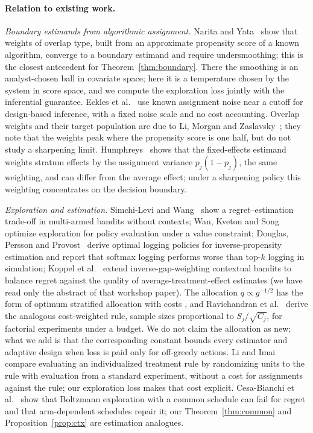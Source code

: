 \documentclass[12pt]{article}
\theoremstyle{definition}
\theoremstyle{remark}
\begin{document}
\paragraph{Relation to existing work.}
\emph{Boundary estimands from algorithmic assignment.}
Narita and Yata~\cite{narita2021algorithm} show that weights of overlap type, built from an
approximate propensity score of a known algorithm, converge to a boundary
estimand and require undersmoothing; this is the closest antecedent for
Theorem~\ref{thm:boundary}. There the smoothing is an analyst-chosen ball in
covariate space; here it is a temperature chosen by the system in score space,
and we compute the exploration loss jointly with the inferential guarantee.
Eckles et al.~\cite{eckles2020noise} use known assignment noise near a cutoff for
design-based inference, with a fixed noise scale and no cost accounting.
Overlap weights and their target population are due to
Li, Morgan and Zaslavsky~\cite{li2018balancing}; they note that the weights peak where the propensity
score is one half, but do not study a sharpening limit. Humphreys~\cite{humphreys2025bounds}
shows that the fixed-effects estimand weights stratum effects by the assignment
variance $p_j(1-p_j)$, the same weighting, and can differ from the average
effect; under a sharpening policy this weighting concentrates on the decision
boundary.

\emph{Exploration and estimation.} Simchi-Levi and Wang~\cite{simchilevi2023multi} show a
regret--estimation trade-off in multi-armed bandits without contexts;
Wan, Kveton and Song~\cite{wan2022safe} optimize exploration for policy evaluation under a value
constraint; Douglas, Persson and Provost~\cite{douglas2026logging} derive optimal logging policies for
inverse-propensity estimation and report that softmax logging performs worse
than top-$k$ logging in simulation; Koppel et al.~\cite{koppel2025explore} extend
inverse-gap-weighting contextual bandits to balance regret against the quality
of average-treatment-effect estimates (we have read only the abstract of that
workshop paper). The allocation $q\propto g^{-1/2}$ has the
form of optimum stratified allocation with costs \cite{cochran1977sampling},
and Ravichandran et al.~\cite{ravichandran2024optimal} derive the analogous
cost-weighted rule, sample sizes proportional to $S_j/\sqrt{C_j}$, for factorial
experiments under a budget. We do not claim the allocation as new; what we add
is that the corresponding constant bounds every estimator and adaptive design
when loss is paid only for off-greedy actions. Li and
Imai~\cite{li2024neyman} compare evaluating an individualized treatment rule by
randomizing units to the rule with evaluation from a standard experiment,
without a cost for assignments against the rule; our exploration loss makes
that cost explicit. Cesa-Bianchi et al.~\cite{cesabianchi2017boltzmann} show
that Boltzmann exploration with a common schedule can fail for regret and that
arm-dependent schedules repair it; our Theorem~\ref{thm:common} and
Proposition~\ref{prop:ctx} are estimation analogues.
\end{document}
